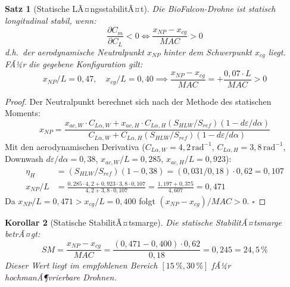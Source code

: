 ﻿\documentclass[12pt,a4paper]{article}
\newtheorem{theorem}{Satz}[section]
\newtheorem{korollar}[theorem]{Korollar}
\theoremstyle{remark}
\begin{document}
	\begin{theorem}[Statische LÃ¤ngsstabilitÃ¤t]
		\label{thm:stabilitÃ¤t}
		Die BioFalcon-Drohne ist statisch longitudinal stabil, wenn:
		\begin{equation}
			\frac{\partial C_m}{\partial C_L} < 0
			\iff
			\frac{x_{NP} - x_{cg}}{MAC} > 0
			\label{eq:stabilitÃ¤t}
		\end{equation}
		d.h.\ der aerodynamische Neutralpunkt $x_{NP}$ hinter dem Schwerpunkt $x_{cg}$
		liegt. FÃ¼r die gegebene Konfiguration gilt:
		\begin{equation}
			x_{NP}/L = 0{,}47, \quad x_{cg}/L = 0{,}40
			\implies
			\frac{x_{NP} - x_{cg}}{MAC} = +\frac{0{,}07 \cdot L}{MAC} > 0
			\label{eq:sm}
		\end{equation}
	\end{theorem}
	
	\begin{proof}
		Der Neutralpunkt berechnet sich nach der Methode des statischen Moments:
		\begin{equation}
			x_{NP} = \frac{x_{ac,W} \cdot C_{L\alpha,W} + x_{ac,H} \cdot C_{L\alpha,H}
				(S_{HLW}/S_{ref})(1 - d\varepsilon/d\alpha)}
			{C_{L\alpha,W} + C_{L\alpha,H}(S_{HLW}/S_{ref})(1 - d\varepsilon/d\alpha)}
		\end{equation}
		Mit den aerodynamischen Derivativa ($C_{L\alpha,W} = 4{,}2\,\text{rad}^{-1}$,
		$C_{L\alpha,H} = 3{,}8\,\text{rad}^{-1}$, Downwash $d\varepsilon/d\alpha = 0{,}38$,
		$x_{ac,W}/L = 0{,}285$, $x_{ac,H}/L = 0{,}923$):
		\begin{align}
			\eta_H &= (S_{HLW}/S_{ref})(1 - 0{,}38) = (0{,}031/0{,}18)\cdot 0{,}62 = 0{,}107 \\
			x_{NP}/L &= \frac{0{,}285 \cdot 4{,}2 + 0{,}923 \cdot 3{,}8 \cdot 0{,}107}
			{4{,}2 + 3{,}8 \cdot 0{,}107}
			= \frac{1{,}197 + 0{,}375}{4{,}607}
			= 0{,}471
		\end{align}
		Da $x_{NP}/L = 0{,}471 > x_{cg}/L = 0{,}400$ folgt
		$(x_{NP}-x_{cg})/MAC > 0$. \qquad$\square$
	\end{proof}
	
	\begin{korollar}[Statische StabilitÃ¤tsmarge]
		\label{cor:sm}
		Die statische StabilitÃ¤tsmarge betrÃ¤gt:
		\begin{equation}
			SM = \frac{x_{NP} - x_{cg}}{MAC}
			= \frac{(0{,}471 - 0{,}400) \cdot 0{,}62}{0{,}18}
			= 0{,}245 = 24{,}5\,\%
			\label{eq:sm_wert}
		\end{equation}
		Dieser Wert liegt im empfohlenen Bereich $[15\,\%, 30\,\%]$ fÃ¼r hochmanÃ¶vrierbare
		Drohnen.
	\end{korollar}
	
\end{document}
